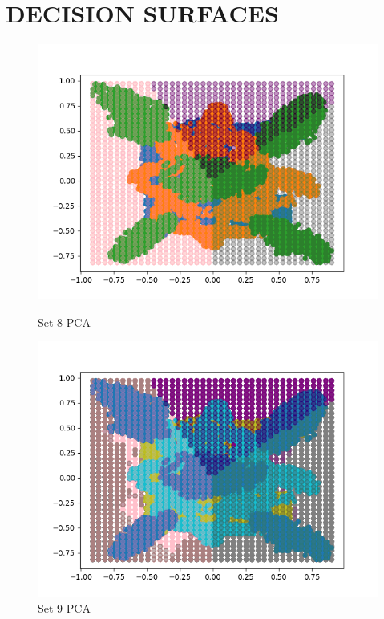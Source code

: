 \documentclass{article}
\begin{document}
\section{\MakeUppercase{Decision Surfaces}}
\begin{figure}[H]
	\centering
	\begin{minipage}{.33\textwidth}
			\centering
			\includegraphics[width=1\linewidth]{../set8PCAdecisions.png}
			\caption{Set 8 PCA}
	\end{minipage}\hfill
        \centering
	\begin{minipage}{.33\textwidth}
			\centering
			\includegraphics[width=1\linewidth]{../set9PCAdecisions.png}
			\caption{Set 9 PCA}
	\end{minipage}\hfill

\end{figure}
\end{document}
